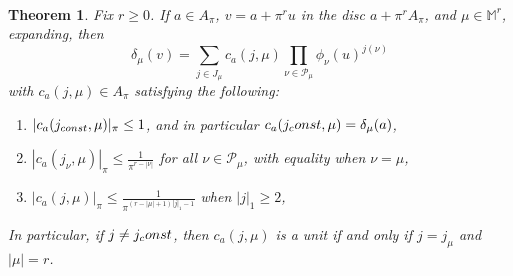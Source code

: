 \documentclass[10pt,a4paper]{amsart}
\newtheorem{thm}{Theorem}[section]
\begin{document}
\







\begin{thm}\label{lma1} Fix $r \geq 0$. If $a \in A_{\pi}$, $v = a + \pi^r u$ in the disc $a+ \pi^r A_{\pi}$, and $\mu \in \mathbb{M}^r$, expanding, then $$\delta_{\mu}(v) = \sum_{j \in J_\mu} c_a(j,\mu) \prod_{\nu \in \mathcal{P}_\mu} \phi_\nu(u)^{j(\nu)}$$ with $c_a(j,\mu) \in A_\pi$ satisfying the following:
\begin{enumerate}
\item $|c_a(j_{\textup{const}},\mu)|_\pi \leq 1$, and in particular $c_a(j_\textup{const},\mu) = \delta_\mu(a)$,
\item $|c_a(j_{\nu},\mu)|_\pi \leq \frac{1}{\pi^{r-|\nu|}}$ for all $\nu\in\mathcal{P}_\mu$, with equality when $\nu = \mu$,
\item $|c_a(j,\mu)|_\pi \leq \frac{1}{\pi^{(r-|\mu|+1)|j|_1-1}}$ when $|j|_1\geq 2$,
\end{enumerate}
In particular, if $j\neq j_\textup{const}$, then $c_a(j,\mu)$ is a unit if and only if $j = j_\mu$ and $|\mu|= r$.
\end{thm}
\end{document}

